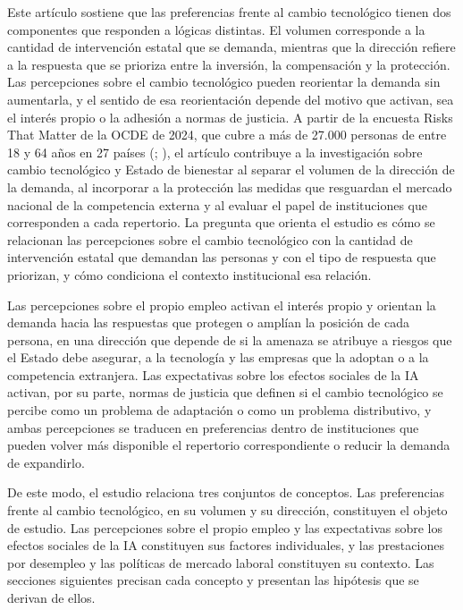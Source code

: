 \documentclass[
  spanish,
  12pt,
]{article}
\begin{document}
Este artículo sostiene que las preferencias frente al cambio tecnológico
tienen dos componentes que responden a lógicas distintas. El volumen
corresponde a la cantidad de intervención estatal que se demanda,
mientras que la dirección refiere a la respuesta que se prioriza entre
la inversión, la compensación y la protección. Las percepciones sobre el
cambio tecnológico pueden reorientar la demanda sin aumentarla, y el
sentido de esa reorientación depende del motivo que activan, sea el
interés propio o la adhesión a normas de justicia. A partir de la
encuesta Risks That Matter de la OCDE de 2024, que cubre a más de 27.000
personas de entre 18 y 64 años en 27 países
(;
), el artículo
contribuye a la investigación sobre cambio tecnológico y Estado de
bienestar al separar el volumen de la dirección de la demanda, al
incorporar a la protección las medidas que resguardan el mercado
nacional de la competencia externa y al evaluar el papel de
instituciones que corresponden a cada repertorio. La pregunta que
orienta el estudio es cómo se relacionan las percepciones sobre el
cambio tecnológico con la cantidad de intervención estatal que demandan
las personas y con el tipo de respuesta que priorizan, y cómo condiciona
el contexto institucional esa relación.

Las percepciones sobre el propio empleo activan el interés propio y
orientan la demanda hacia las respuestas que protegen o amplían la
posición de cada persona, en una dirección que depende de si la amenaza
se atribuye a riesgos que el Estado debe asegurar, a la tecnología y las
empresas que la adoptan o a la competencia extranjera. Las expectativas
sobre los efectos sociales de la IA activan, por su parte, normas de
justicia que definen si el cambio tecnológico se percibe como un
problema de adaptación o como un problema distributivo, y ambas
percepciones se traducen en preferencias dentro de instituciones que
pueden volver más disponible el repertorio correspondiente o reducir la
demanda de expandirlo.

De este modo, el estudio relaciona tres conjuntos de conceptos. Las
preferencias frente al cambio tecnológico, en su volumen y su dirección,
constituyen el objeto de estudio. Las percepciones sobre el propio
empleo y las expectativas sobre los efectos sociales de la IA
constituyen sus factores individuales, y las prestaciones por desempleo
y las políticas de mercado laboral constituyen su contexto. Las
secciones siguientes precisan cada concepto y presentan las hipótesis
que se derivan de ellos.
\end{document}
